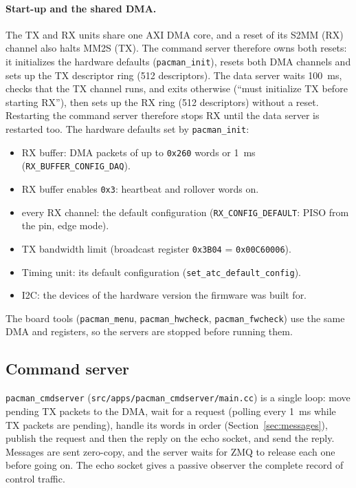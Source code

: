 \documentclass[12pt]{article}
\newcommand{\hex}[1]{\texttt{0x#1}}
\newcommand{\f}[1]{\texttt{#1}}
\begin{document}
\paragraph{Start-up and the shared DMA.}  The TX and RX units share one AXI DMA core, and a reset of
its S2MM (RX) channel also halts MM2S (TX).  The command server therefore owns both resets:  it
initializes the hardware defaults (\f{pacman\_init}), resets both DMA channels and sets up the TX
descriptor ring (512 descriptors).  The data server waits 100~ms, checks that the TX channel runs,
and exits otherwise (``must initialize TX before starting RX''), then sets up the RX ring (512
descriptors) without a reset.  Restarting the command server therefore stops RX until the data server
is restarted too.  The hardware defaults set by \f{pacman\_init}:
\begin{itemize}
\item RX buffer:  DMA packets of up to \hex{260} words or 1~ms (\f{RX\_BUFFER\_CONFIG\_DAQ}).
\item RX buffer enables \hex{3}:  heartbeat and rollover words on.
\item every RX channel:  the default configuration (\f{RX\_CONFIG\_DEFAULT}:  PISO from the pin, edge
  mode).
\item TX bandwidth limit (broadcast register \hex{3B04} = \hex{00C60006}).
\item Timing unit:  its default configuration (\f{set\_atc\_default\_config}).
\item I2C:  the devices of the hardware version the firmware was built for.
\end{itemize}
The board tools (\f{pacman\_menu}, \f{pacman\_hwcheck}, \f{pacman\_fwcheck}) use the same DMA and
registers, so the servers are stopped before running them.

\subsection{Command server}\label{sec:cmdserver}

\f{pacman\_cmdserver} (\f{src/apps/pacman\_cmdserver/main.cc}) is a single loop:  move pending TX
packets to the DMA, wait for a request (polling every 1~ms while TX packets are pending), handle its
words in order (Section~\ref{sec:messages}), publish the request and then the reply on the echo
socket, and send the reply.  Messages are sent zero-copy, and the server waits for ZMQ to release
each one before going on.  The echo socket gives a passive observer the complete record of control
traffic.
\end{document}
